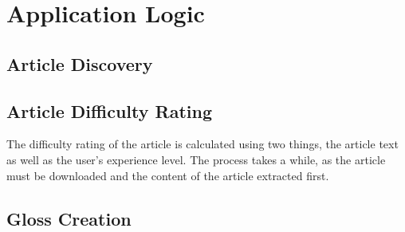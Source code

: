 \chapter{Application Logic}

\section{Article Discovery}

\section{Article Difficulty Rating}

The difficulty rating of the article is calculated using two things, the article text as well as the user's experience level. The process takes a while, as the article must be downloaded and the content of the article extracted first. 

\section{Gloss Creation}
